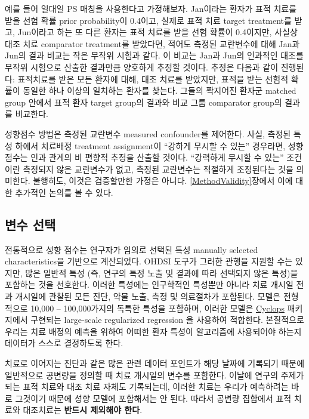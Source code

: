 \documentclass[10.5pt]{book}
\theoremstyle{definition}
\theoremstyle{definition}
\theoremstyle{definition}
\theoremstyle{remark}
\let\BeginKnitrBlock\begin \let\EndKnitrBlock\end
\begin{document}
예를 들어 일대일 PS 매칭을 사용한다고 가정해보자. Jan이라는 환자가 표적
치료를 받을 선험 확률 prior probability이 0.4이고, 실제로 표적 치료
target treatment를 받고, Jun이라고 하는 또 다른 환자는 표적 치료를 받을
선험 확률이 0.4이지만, 사실상 대조 치료 comparator treatment를 받았다면,
적어도 측정된 교란변수에 대해 Jan과 Jun의 결과 비교는 작은 무작위 시험과
같다. 이 비교는 Jan과 Jun의 인과적인 대조를 무작위 시험으로 산출한
결과만큼 양호하게 추정할 것이다. 추정은 다음과 같이 진행된다: 표적치료를
받은 모든 환자에 대해, 대조 치료를 받았지만, 표적을 받는 선험적 확률이
동일한 하나 이상의 일치하는 환자를 찾는다. 그들의 짝지어진 환자군
matched group 안에서 표적 환자 target group의 결과와 비교 그룹
comparator group의 결과를 비교한다.

성향점수 방법은 측정된 교란변수 measured confounder를 제어한다. 사실,
측정된 특성 하에서 치료배정 treatment assignment이 ``강하게 무시할 수
있는'' 경우라면, 성향 점수는 인과 관계의 비 편향적 추정을 산출할 것이다.
``강력하게 무시할 수 있는'' 조건이란 측정되지 않은 교란변수가 없고,
측정된 교란변수는 적절하게 조정된다는 것을 의미한다. 불행히도, 이것은
검증할만한 가정은 아니다. \ref{MethodValidity}장에서 이에 대한 추가적인
논의를 볼 수 있다. 

\subsection{변수 선택}\label{VariableSelection}

전통적으로 성향 점수는 연구자가 임의로 선택된 특성 manually selected
characteristics을 기반으로 계산되었다. OHDSI 도구가 그러한 관행을 지원할
수는 있지만, 많은 일반적 특성 (즉, 연구의 특정 노출 및 결과에 따라
선택되지 않은 특성)을 포함하는 것을 선호한다. \citep{tian_2018} 이러한
특성에는 인구학적인 특성뿐만 아니라 치료 개시일 전과 개시일에 관찰된
모든 진단, 약물 노출, 측정 및 의료절차가 포함된다. 모델은 전형적으로
10,000 -- 100,000가지의 독특한 특성을 포함하며, 이러한 모델은
\href{https://ohdsi.github.io/Cyclops/}{Cyclops} 패키지에서 구현되는
large-scale regularized regression \citep{suchard_2013} 을 사용하여
적합한다. 본질적으로 우리는 치료 배정의 예측을 위하여 어떠한 환자 특성이
알고리즘에 사용되어야 하는지 데이터가 스스로 결정하도록 한다.

\BeginKnitrBlock{rmdimportant}
치료로 이어지는 진단과 같은 많은 관련 데이터 포인트가 해당 날짜에
기록되기 때문에 일반적으로 공변량을 정의할 때 치료 개시일의 변수를
포함한다. 이날에 연구의 주제가 되는 표적 치료와 대조 치료 자체도
기록되는데, 이러한 치료는 우리가 예측하려는 바로 그것이기 때문에 성향
모델에 포함해서는 안 된다. 따라서 공변량 집합에서 표적 치료와 대조치료는
\textbf{반드시 제외해야 한다}.
\EndKnitrBlock{rmdimportant}
\end{document}
